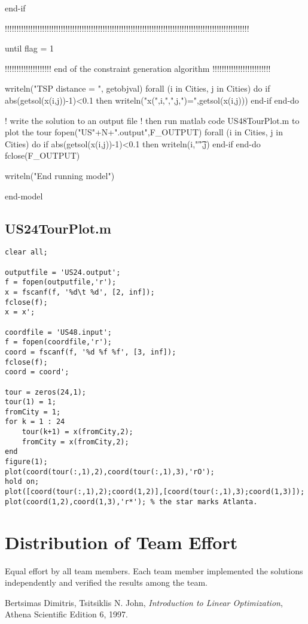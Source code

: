 \documentclass[twoside,12pt]{article}
\begin{document}
\begin{verbatim*}
	end-if

    !!!!!!!!!!!!!!!!!!!!!!!!!!!!!!!!!!!!!!!!!!!!!!!!!!!!!!!!!!!!!!!!!!!!!!!!!!!!!!!!!!!!!!!!!!!!!!!!!!!!!!!!!
  
    
until flag = 1

!!!!!!!!!!!!!!!!!!!! end of the constraint generation algorithm !!!!!!!!!!!!!!!!!!!!!!!!!

	writeln("\nOptimal TSP distance = ", getobjval)
	forall (i in Cities, j in Cities) do
		if abs(getsol(x(i,j))-1)<0.1 then
			writeln("x(",i,",",j,")=",getsol(x(i,j)))
		end-if
	end-do
	
	! write the solution to an output file 
	! then run matlab code US48TourPlot.m to plot the tour
	fopen("US"+N+".output",F_OUTPUT)
	forall (i in Cities, j in Cities) do
		if abs(getsol(x(i,j))-1)<0.1 then
			writeln(i,"\t",j)
		end-if
	end-do
	fclose(F_OUTPUT)

writeln("End running model")

end-model
\end{verbatim*}


\subsection{US24TourPlot.m}
\begin{verbatim}
clear all;

outputfile = 'US24.output';
f = fopen(outputfile,'r');
x = fscanf(f, '%d\t %d', [2, inf]);
fclose(f);
x = x';

coordfile = 'US48.input';
f = fopen(coordfile,'r');
coord = fscanf(f, '%d %f %f', [3, inf]);
fclose(f);
coord = coord';

tour = zeros(24,1);
tour(1) = 1;
fromCity = 1;
for k = 1 : 24
    tour(k+1) = x(fromCity,2);
    fromCity = x(fromCity,2);
end
figure(1);
plot(coord(tour(:,1),2),coord(tour(:,1),3),'rO');
hold on;
plot([coord(tour(:,1),2);coord(1,2)],[coord(tour(:,1),3);coord(1,3)]);
plot(coord(1,2),coord(1,3),'r*'); % the star marks Atlanta.
\end{verbatim}



\section{Distribution of Team Effort}
Equal effort by all team members. Each team member implemented the solutions independently and verified the results among the team.





\begin{thebibliography}{9}

  Bertsimas Dimitris, Tsitsiklis N. John,
  \emph{Introduction to Linear Optimization},
  Athena Scientific Edition 6,
  1997.

\end{thebibliography}
\end{document}
